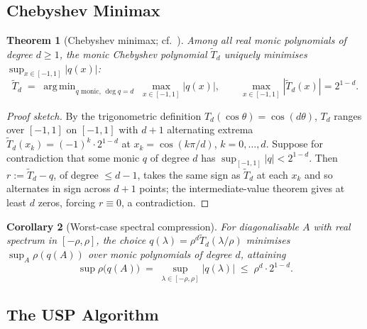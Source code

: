 \documentclass[11pt]{article}
\theoremstyle{plain}
\newtheorem{theorem}{Theorem}[section]
\newtheorem{corollary}[theorem]{Corollary}
\theoremstyle{definition}
\theoremstyle{remark}
\newcommand{\abs}[1]{\left\lvert#1\right\rvert}
\DeclareMathOperator*{\argmin}{arg\,min}
\begin{document}
\subsection{Chebyshev Minimax}
\label{sec:cheb-minimax}

\begin{theorem}[Chebyshev minimax; cf.\ \citealp{davis1975interpolation}]
\label{thm:chebyshev-minimax}
Among all real monic polynomials of degree $d \geq 1$, the monic Chebyshev polynomial $\tilde T_d$ uniquely minimises $\sup_{x \in [-1,1]} \abs{q(x)}$:
\[
    \tilde T_d \;=\; \argmin_{q \text{ monic, } \deg q = d} \; \max_{x \in [-1,1]} \abs{q(x)}, \qquad \max_{x \in [-1,1]} \abs{\tilde T_d(x)} = 2^{1-d}.
\]
\end{theorem}

\begin{proof}[Proof sketch]
By the trigonometric definition $T_d(\cos\theta) = \cos(d\theta)$, $T_d$ ranges over $[-1,1]$ on $[-1,1]$ with $d+1$ alternating extrema $\tilde T_d(x_k) = (-1)^k \cdot 2^{1-d}$ at $x_k = \cos(k\pi/d)$, $k = 0, \ldots, d$. Suppose for contradiction that some monic $q$ of degree $d$ has $\sup_{[-1,1]} \abs{q} < 2^{1-d}$. Then $r := \tilde T_d - q$, of degree $\leq d-1$, takes the same sign as $\tilde T_d$ at each $x_k$ and so alternates in sign across $d+1$ points; the intermediate-value theorem gives at least $d$ zeros, forcing $r \equiv 0$, a contradiction.
\end{proof}

\begin{corollary}[Worst-case spectral compression]
\label{cor:spectral-compression}
For diagonalisable $A$ with real spectrum in $[-\rho, \rho]$, the choice $q(\lambda) = \rho^d \tilde T_d(\lambda/\rho)$ minimises $\sup_A \rho(q(A))$ over monic polynomials of degree $d$, attaining
\[
    \sup \rho\big(q(A)\big) \;=\; \sup_{\lambda \in [-\rho, \rho]} \abs{q(\lambda)} \;\leq\; \rho^d \cdot 2^{1-d}.
\]
\end{corollary}

\subsection{The USP Algorithm}
\label{sec:usp-algorithm}
\end{document}
